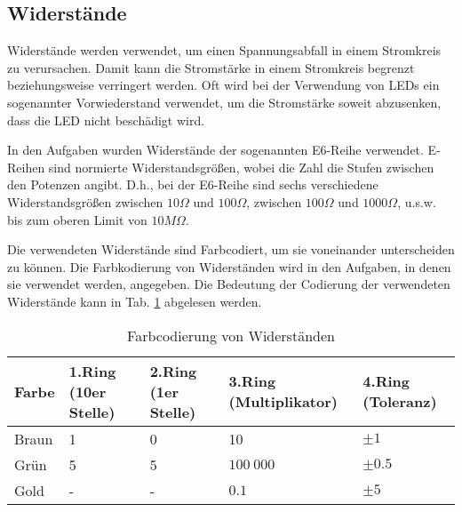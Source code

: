 \documentclass[11pt]{article}
\begin{document}
    \subsection{Widerstände}
    \label{subsec:widerstände}

    Widerstände werden verwendet, um einen Spannungsabfall in einem Stromkreis zu verursachen.
    Damit kann die Stromstärke in einem Stromkreis begrenzt beziehungsweise verringert werden.
    Oft wird bei der Verwendung von LEDs ein sogenannter Vorwiederstand verwendet, um die Stromstärke soweit abzusenken, dass die LED nicht beschädigt wird.

    In den Aufgaben wurden Widerstände der sogenannten E6-Reihe verwendet.
    E-Reihen sind normierte Widerstandsgrößen, wobei die Zahl die Stufen zwischen den Potenzen angibt.
    D.h., bei der E6-Reihe sind sechs verschiedene Widerstandsgrößen zwischen $10\Omega$ und $100\Omega$, zwischen $100\Omega$ und $1000\Omega$, u.s.w. bis zum oberen Limit von $10M\Omega$.

    Die verwendeten Widerstände sind Farbcodiert, um sie voneinander unterscheiden zu können.
    Die Farbkodierung von Widerständen wird in den Aufgaben, in denen sie verwendet werden, angegeben.
    Die Bedeutung der Codierung der verwendeten Widerstände kann in Tab. \ref{tab:farbcodierung-von-widerständen} abgelesen werden.

    \begin{table}
        \begin{adjustwidth}{-2cm}{}
            \caption{Farbcodierung von Widerständen}
            \label{tab:farbcodierung-von-widerständen}
            \begin{tabular}{| l | l | l | l | l |}
                \hline
                Farbe & 1.Ring (10er Stelle) & 2.Ring (1er Stelle) & 3.Ring (Multiplikator) & 4.Ring (Toleranz) \\
                \hline
                Braun & 1                    & 0                   & 10                     & $\pm 1$           \\
                Grün  & 5                    & 5                   & $100\ 000$             & $\pm 0.5$         \\
                Gold  & -                    & -                   & $0.1$                  & $\pm 5$           \\
                \hline
            \end{tabular}
        \end{adjustwidth}
    \end{table}
\end{document}
